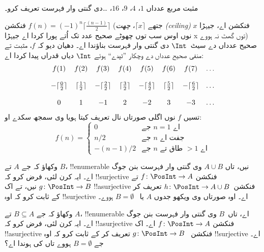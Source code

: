 \documentclass[../../../include/open-logic-section]{subfiles}
\begin{document}
\begin{prob}
مثبت مربع عدداں $1$، $4$، $9$، $16$، \dots دی گنتی وار فہرست تعریف کرو۔
\end{prob}

\begin{ex}
فنکشن $f(n) = (-1)^{n} \lceil \frac{(n-1)}{2}\rceil$ (جتھے
$\lceil x \rceil$، \emph{چھت (ceiling)} فنکشن اے، جیہڑا $x$ نوں اوس
سب توں چھوٹے صحیح عدد تک اُتے پورا کردا اے جیہڑا x توں گھٹ نہ ہووے)
صحیح عدداں دے سیٹ~$\Int$ دی گنتی
وار فہرست بناؤندا اے۔ دھیان دیو کہ $f$، مثبت تے منفی صحیح عدداں دے
وچکار ”ٹپدے“ ہوئے $\Int$ دیاں قدراں پیدا کردا اے:
\[
\begin{array}{c c c c c c c c}
f(1) & f(2) & f(3) & f(4) & f(5) & f(6) & f(7) & \dots \\ \\
- \lceil \tfrac{0}{2} \rceil & \lceil \tfrac{1}{2}\rceil & - \lceil \tfrac{2}{2} \rceil & \lceil \tfrac{3}{2} \rceil & - \lceil \tfrac{4}{2} \rceil  & \lceil \tfrac{5}{2}
\rceil & - \lceil \tfrac{6}{2} \rceil & \dots \\ \\
0 & 1 & -1 & 2 & -2 & 3 & -3 & \dots
\end{array}
\]
تسیں $f$ نوں اگلی صورتاں نال تعریف کیتا ہویا وی سمجھ سکدے او:
\[
f(n) = \begin{cases}
  0 & \text{جے $n = 1$ اے}\\
  n/2 & \text{جے $n$ جفت اے}\\
  -(n-1)/2 & \text{جے $n$ طاق تے $>1$ اے}
  \end{cases}
\]
\end{ex}

\begin{prob}
  وکھاؤ کہ جے $A$ تے $B$، !!{enumerable} نیں، تاں $A \cup B$ وی
  گنتی وار فہرست بنن جوگ اے۔ ایہ کرن لئی، فرض کرو کہ !!{surjective} فنکشن
  $f\colon \PosInt \to A$ تے $g\colon \PosInt \to B$ نیں، تے اک
  !!a{surjective} فنکشن~$h\colon \PosInt \to A \cup B$ تعریف کر کے
  ثابت کرو کہ اوہ !!{surjective} اے۔ اوہ صورتاں وی ویکھو جدوں $A$ یا
  ~$B = \emptyset$ ہووے۔
\end{prob}

\begin{prob}
  وکھاؤ کہ جے $B \subseteq A$ تے $A$، !!{enumerable} اے، تاں~$B$ وی
  گنتی وار فہرست بنن جوگ اے۔ ایہ کرن لئی، فرض کرو کہ !!a{surjective} فنکشن
  $f\colon \PosInt \to A$ اے۔ اک !!a{surjective} فنکشن
  ~$g\colon \PosInt \to B$ تعریف کر کے ثابت کرو کہ اوہ
  !!{surjective} اے۔ جے $B = \emptyset$ ہووے تاں کی ہوندا اے؟
\end{prob}
\end{document}
